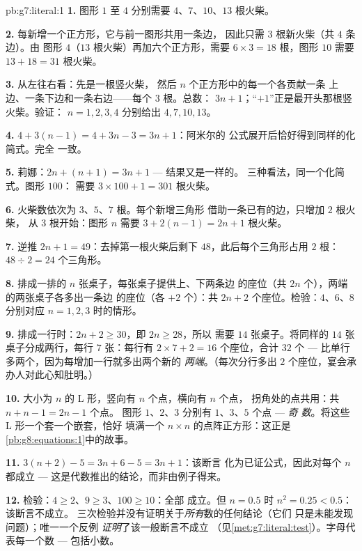 \begin{solution}{pb:g7:literal:1}
\textbf{1.} 图形 $1$ 至 $4$ 分别需要 $4$、$7$、$10$、$13$
根火柴。

\textbf{2.} 每新增一个正方形，它与前一图形共用一条边，
因此只需 $3$ 根新火柴（共 $4$ 条边）。由
图形 $4$（$13$ 根火柴）再加六个正方形，需要
$6 \times 3 = 18$ 根，图形 $10$ 需要 $13 + 18 = 31$ 根火柴。

\textbf{3.} 从左往右看：先是一根竖火柴，
然后 $n$ 个正方形中的每一个各贡献一条
上边、一条下边和一条右边——每个 $3$ 根。总数：
$3n + 1$；“$+1$”正是最开头那根竖火柴。验证：
$n = 1, 2, 3, 4$ 分别给出 $4, 7, 10, 13$。

\textbf{4.} $4 + 3(n - 1) = 4 + 3n - 3 = 3n + 1$：阿米尔的
公式展开后恰好得到同样的化简式。完全
一致。

\textbf{5.} 莉娜：$2n + (n + 1) = 3n + 1$ --- 结果又是一样的。
三种看法，同一个化简式。图形 $100$：
需要 $3 \times 100 + 1 = 301$ 根火柴。

\textbf{6.} 火柴数依次为 $3$、$5$、$7$ 根。每个新增三角形
借助一条已有的边，只增加 $2$ 根火柴，
从 $3$ 根开始：图形 $n$ 需要 $3 + 2(n - 1) = 2n + 1$ 根火柴。

\textbf{7.} 逆推 $2n + 1 = 49$：去掉第一根火柴后剩下
$48$，此后每个三角形占用 $2$ 根：
$48 \div 2 = 24$ 个三角形。

\textbf{8.} 排成一排的 $n$ 张桌子，每张桌子提供上、下两条边
的座位（共 $2n$ 个），两端的两张桌子各多出一条边
的座位（各 $+2$ 个）：共 $2n + 2$ 个座位。检验：$4$、$6$、$8$
分别对应 $n = 1, 2, 3$ 时的情形。

\textbf{9.} 排成一行时：$2n + 2 \geq 30$，即 $2n \geq 28$，所以
需要 $14$ 张桌子。将同样的 $14$ 张桌子分成两行，每行
$7$ 张：每行有 $2 \times 7 + 2 = 16$ 个座位，合计 $32$ 个 ---
比单行多两个，因为每增加一行就多出两个新的
\emph{两端}。（每次分行多出 $2$ 个座位，宴会承办人对此心知肚明。）

\textbf{10.} 大小为 $n$ 的 L 形，竖向有 $n$ 个点，横向有 $n$ 个点，
拐角处的点共用：共 $n + n - 1 = 2n - 1$ 个点。
图形 $1$、$2$、$3$ 分别有 $1$、$3$、$5$ 个点 --- \emph{奇
数}。将这些 L 形一个套一个嵌套，恰好
填满一个 $n \times n$ 的点阵正方形：这正是
\cref{pb:g8:equations:1}中的故事。

\textbf{11.} $3(n + 2) - 5 = 3n + 6 - 5 = 3n + 1$：该断言
化为已证公式，因此对每个 $n$ 都成立 ---
这是代数推出的结论，而非由例子得来。

\textbf{12.} 检验：$4 \geq 2$、$9 \geq 3$、$100 \geq 10$：全部
成立。但 $n = 0.5$ 时 $n^2 = 0.25 < 0.5$：该断言不成立。
三次检验并没有证明关于\emph{所有}数的任何结论（它们
只是未能发现问题）；唯一一个反例
\emph{证明}了该一般断言不成立
（见\cref{met:g7:literal:test}）。字母代表每一个数
--- 包括小数。


\end{solution}
